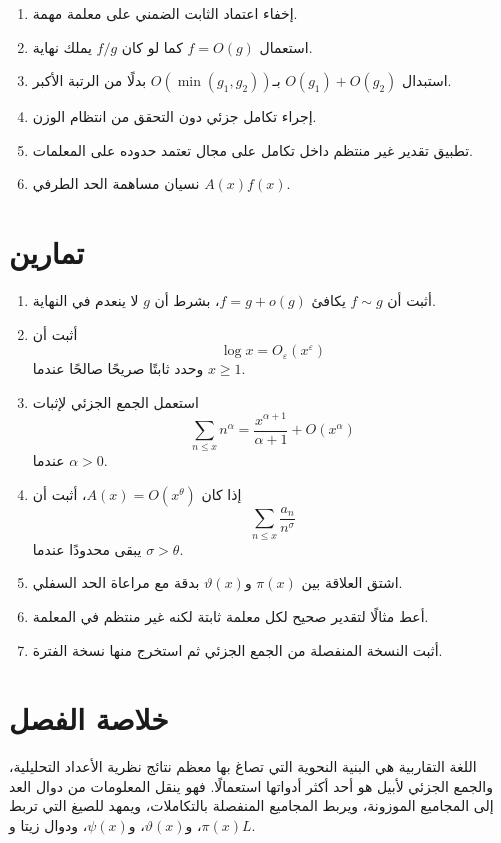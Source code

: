 \begin{enumerate}
  \item إخفاء اعتماد الثابت الضمني على معلمة مهمة.
  \item استعمال \(f=O(g)\) كما لو كان \(f/g\) يملك نهاية.
  \item استبدال \(O(g_1)+O(g_2)\) بـ\(O(\min(g_1,g_2))\) بدلًا من الرتبة الأكبر.
  \item إجراء تكامل جزئي دون التحقق من انتظام الوزن.
  \item تطبيق تقدير غير منتظم داخل تكامل على مجال تعتمد حدوده على المعلمات.
  \item نسيان مساهمة الحد الطرفي \(A(x)f(x)\).
\end{enumerate}

\section{تمارين}

\begin{enumerate}
  \item أثبت أن \(f\sim g\) يكافئ \(f=g+o(g)\)، بشرط أن \(g\) لا ينعدم في النهاية.
  \item أثبت أن
  \[
  \log x=O_\varepsilon(x^\varepsilon)
  \]
  وحدد ثابتًا صريحًا صالحًا عندما \(x\geq1\).
  \item استعمل الجمع الجزئي لإثبات
  \[
  \sum_{n\leq x}n^\alpha
  =
  \frac{x^{\alpha+1}}{\alpha+1}+O(x^\alpha)
  \]
  عندما \(\alpha>0\).
  \item إذا كان \(A(x)=O(x^\theta)\)، أثبت أن
  \[
  \sum_{n\leq x}\frac{a_n}{n^\sigma}
  \]
  يبقى محدودًا عندما \(\sigma>\theta\).
  \item اشتق العلاقة بين \(\pi(x)\) و\(\vartheta(x)\) بدقة مع مراعاة الحد السفلي.
  \item أعط مثالًا لتقدير صحيح لكل معلمة ثابتة لكنه غير منتظم في المعلمة.
  \item أثبت النسخة المنفصلة من الجمع الجزئي ثم استخرج منها نسخة الفترة.
\end{enumerate}

\section{خلاصة الفصل}

اللغة التقاربية هي البنية النحوية التي تصاغ بها معظم نتائج نظرية الأعداد التحليلية، والجمع الجزئي لأبيل هو أحد أكثر أدواتها استعمالًا. فهو ينقل المعلومات من دوال العد إلى المجاميع الموزونة، ويربط المجاميع المنفصلة بالتكاملات، ويمهد للصيغ التي تربط \(\pi(x)\)، و\(\vartheta(x)\)، و\(\psi(x)\)، ودوال زيتا و\(L\).
